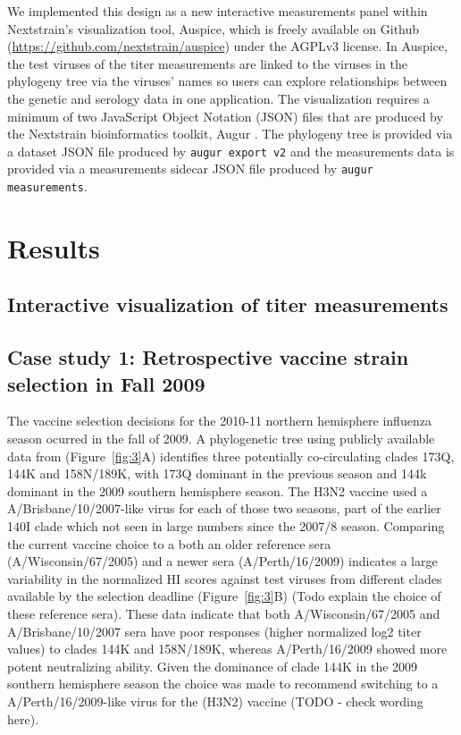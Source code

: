 \documentclass[utf8]{FrontiersinHarvard} %
\begin{document}
We implemented this design as a new interactive measurements panel within Nextstrain's visualization tool, Auspice, which is freely available on Github (\url{https://github.com/nextstrain/auspice}) under the AGPLv3 license.
In Auspice, the test viruses of the titer measurements are linked to the viruses in the phylogeny tree via the viruses' names so users can explore relationships between the genetic and serology data in one application.
The visualization requires a minimum of two JavaScript Object Notation (JSON) files that are produced by the Nextstrain bioinformatics toolkit, Augur \citep{Huddleston2021}.
The phylogeny tree is provided via a dataset JSON file produced by \texttt{augur export v2} and the measurements data is provided via a measurements sidecar JSON file produced by \texttt{augur measurements}.

\section{Results}

\subsection{Interactive visualization of titer measurements}

\subsection{Case study 1: Retrospective vaccine strain selection in Fall 2009}

The vaccine selection decisions for the 2010-11 northern hemisphere influenza season ocurred in the fall of 2009.
A phylogenetic tree using publicly available data from \citep{Bedford:2014bf} (Figure~\ref{fig:3}A) identifies three potentially co-circulating clades 173Q, 144K and 158N/189K, with 173Q dominant in the previous season and 144k dominant in the 2009 southern hemisphere season.
The H3N2 vaccine used a A/Brisbane/10/2007-like virus for each of those two seasons, part of the earlier 140I clade which not seen in large numbers since the 2007/8 season.
Comparing the current vaccine choice to a both an older reference sera (A/Wisconsin/67/2005) and a newer sera (A/Perth/16/2009) indicates a large variability in the normalized HI scores against test viruses from different clades available by the selection deadline (Figure~\ref{fig:3}B) (Todo explain the choice of these reference sera).
These data indicate that both A/Wisconsin/67/2005 and A/Brisbane/10/2007 sera have poor responses (higher normalized log2 titer values) to clades 144K and 158N/189K, whereas A/Perth/16/2009 showed more potent neutralizing ability.
Given the dominance of clade 144K in the 2009 southern hemisphere season the choice was made to recommend switching to a A/Perth/16/2009-like virus for the (H3N2) vaccine (TODO - check wording here).
\end{document}
